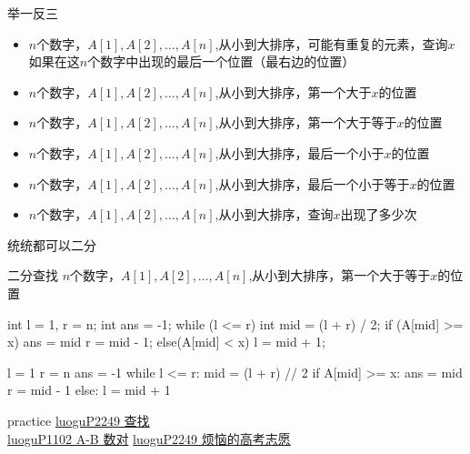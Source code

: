 \documentclass[aspectratio=169,xcolor=dvipsnames]{beamer}
\begin{document}
\begin{frame}[fragile]{举一反三}
    \begin{itemize}
        \item $n$个数字，$A[1],A[2],\ldots,A[n]$,从小到大排序，可能有重复的元素，查询$x$如果在这$n$个数字中出现的最后一个位置（最右边的位置）
        \item $n$个数字，$A[1],A[2],\ldots,A[n]$,从小到大排序，第一个大于$x$的位置
        \item $n$个数字，$A[1],A[2],\ldots,A[n]$,从小到大排序，第一个大于等于$x$的位置
        \item $n$个数字，$A[1],A[2],\ldots,A[n]$,从小到大排序，最后一个小于$x$的位置
        \item $n$个数字，$A[1],A[2],\ldots,A[n]$,从小到大排序，最后一个小于等于$x$的位置
        \item $n$个数字，$A[1],A[2],\ldots,A[n]$,从小到大排序，查询$x$出现了多少次
    \end{itemize}
    \vspace*{2.5em}
    统统都可以二分
\end{frame}


\begin{frame}[fragile]{二分查找}
    $n$个数字，$A[1],A[2],\ldots,A[n]$,从小到大排序，第一个大于等于$x$的位置
    \begin{minipage}{0.45\textwidth}
        \centering
        \begin{cppcode}
    int l = 1, r = n;
    int ans = -1;
    while (l <= r) {
        int mid = (l + r) / 2;
        if (A[mid] >= x) {
            ans = mid
            r = mid - 1;
        } else(A[mid] < x) {
            l = mid + 1;
        }
    }
        \end{cppcode}
    \end{minipage}%
    \hfill
    \begin{minipage}{0.45\textwidth}
        \centering
        \begin{pycode}
    l = 1
    r = n
    ans = -1
    while l <= r:
        mid = (l + r) // 2
        if A[mid] >= x:
            ans = mid
            r = mid - 1
        else:
            l = mid + 1
        \end{pycode}
    \end{minipage}
    
\end{frame}
    

\begin{frame}{practice}
    \href{https://www.luogu.com.cn/problem/P2249}{luoguP2249 查找}\\
    \href{https://www.luogu.com.cn/problem/P1102}{luoguP1102 A-B 数对}
    \href{https://www.luogu.com.cn/problem/P1678}{luoguP2249 烦恼的高考志愿}
\end{frame}
\end{document}

